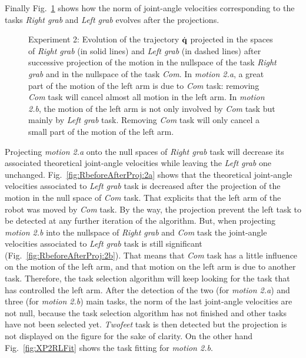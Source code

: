 \documentclass[journal]{IEEEtran}
\begin{document}
Finally Fig.~\ref{fig:RbeforeAfterProj} shows how the norm of joint-angle velocities corresponding to the tasks
\emph{Right grab} and \emph{Left grab} evolves after the projections.
\begin{figure}[p]
\centering
  \subfigure[Motion 2.a]{
  \resizebox{.46\textwidth}{!} {
      
    }
  \label{fig:RbeforeAfterProj:2a}
  }
  \subfigure[Motion 2.b]{
  \resizebox{.46\textwidth}{!} {
      
  }
  \label{fig:RbeforeAfterProj:2b}
  }
  \caption{Experiment 2: Evolution of the trajectory $\dot{{\mathbf{q}}}$ projected in the spaces of
  \emph{Right grab} (in solid lines) and
  \emph{Left grab} (in dashed lines) after
  successive projection of the motion in the nullspace of the task \emph{Right grab} and in the nullspace
  of the task \emph{Com}. In \emph{motion 2.a}, a great part of the motion of the left arm is due to
  \emph{Com} task: removing \emph{Com} task will cancel almost all motion in the left arm.
  In \emph{motion 2.b}, the motion of the left arm is not only involved by \emph{Com} task
  but mainly by \emph{Left grab} task. Removing \emph{Com} task will only
  cancel a small part of the motion of the left arm.}
\label{fig:RbeforeAfterProj}
\end{figure}
Projecting \emph{motion 2.a} onto the null spaces of
\emph{Right grab} task will decrease its associated theoretical joint-angle velocities while leaving the
\emph{Left grab} one unchanged. Fig.~\ref{fig:RbeforeAfterProj:2a} shows
that the theoretical joint-angle velocities associated to
\emph{Left grab} task is decreased after the projection of the motion in
the null space of \emph{Com} task.  That explicits that
the left arm of the robot was moved by \emph{Com} task.
By the way, the projection prevent the left task to be detected at any further iteration of
the algorithm.
But, when projecting \emph{motion 2.b} into the nullspace of \emph{Right grab}
and \emph{Com} task the joint-angle velocities associated to \emph{Left grab} task
is still significant (Fig.~\ref{fig:RbeforeAfterProj:2b}). That means that
\emph{Com} task has a little influence on the
motion of the left arm, and that motion on the left arm is due
to another task. Therefore, the task selection algorithm will keep looking
for the task that has controlled the left arm.
After the detection of the two (for \emph{motion 2.a}) and three (for \emph{motion 2.b}) main tasks,
the norm of the last joint-angle velocities are not null, because
the task selection algorithm has not finished and other tasks have not been selected yet.
\emph{Twofeet} task is then detected but the projection is not displayed on the figure for the sake of clarity.
On the other hand Fig.~\ref{fig:XP2RLFit} shows the task fitting for \emph{motion 2.b}.
\end{document}
